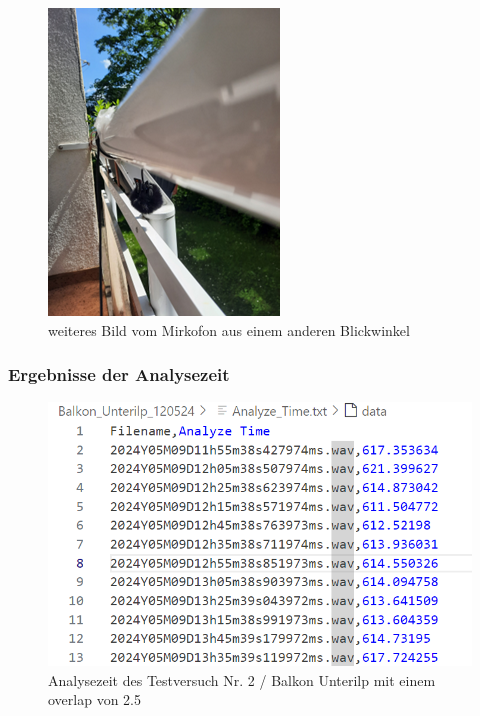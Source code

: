 \begin{figure}
    \centering
    \includegraphics[width=1\linewidth]{bilder/balkon_04.png}
    \caption{weiteres Bild vom Mirkofon aus einem anderen Blickwinkel}
    \label{fig:enter-label}
\end{figure}


\subsubsection{Ergebnisse der Analysezeit}


\begin{figure}
    \centering
    \includegraphics[width=1\linewidth]{bilder/analyze_time_balkon.png}
    \caption{Analysezeit des Testversuch Nr. 2 / Balkon Unterilp mit einem overlap von 2.5}
    \label{fig:analyze_time_balkon}
\end{figure}


